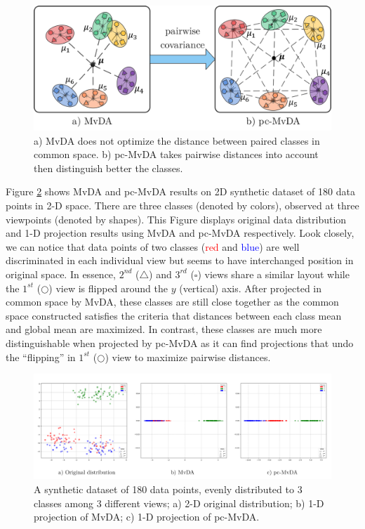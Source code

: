         \begin{figure}[htbp]
            \centering
            \includegraphics[width=0.7\linewidth]{figs/pc-MvDA.png}
            \caption{a) MvDA does not optimize the distance between paired classes in common space. b) pc-MvDA takes pairwise distances into account then distinguish better the classes.}
            \label{fig:pc-MvDA}
        \end{figure}

        Figure \ref{fig:synthetic1} shows MvDA and pc-MvDA results on 2D synthetic dataset of 180 data points in 2-D space.
        There are three classes (denoted by colors), observed at three viewpoints (denoted by shapes).
        This Figure displays original data distribution and 1-D projection results using MvDA and pc-MvDA respectively.
        Look closely, we can notice that data points of two classes (\textcolor{red}{red} and \textcolor{blue}{blue}) are well discriminated in each individual view but seems to have interchanged position in original space.
        In essence, $2^{nd}$ ($\bigtriangleup$) and $3^{rd}$ ($\square$) views share a similar layout while the $1^{st}$ ($\bigcirc$) view is flipped around the $y$ (vertical) axis.
        After projected in common space by MvDA, these classes are still close together as the common space constructed satisfies the criteria that distances between each class mean and global mean are maximized.
        In contrast, these classes are much more distinguishable when projected by pc-MvDA as it can find projections that undo the ``flipping'' in $1^{st}$ ($\bigcirc$) view to maximize pairwise distances.

        \begin{figure}[htbp]
            \centering
            \includegraphics[width=1\linewidth]{figs/Synthetic1.png}
            \caption{A synthetic dataset of 180 data points, evenly distributed to 3 classes among 3 different views; a) 2-D original distribution; b) 1-D projection of MvDA; c) 1-D projection of pc-MvDA.}
            \label{fig:synthetic1}
        \end{figure}

